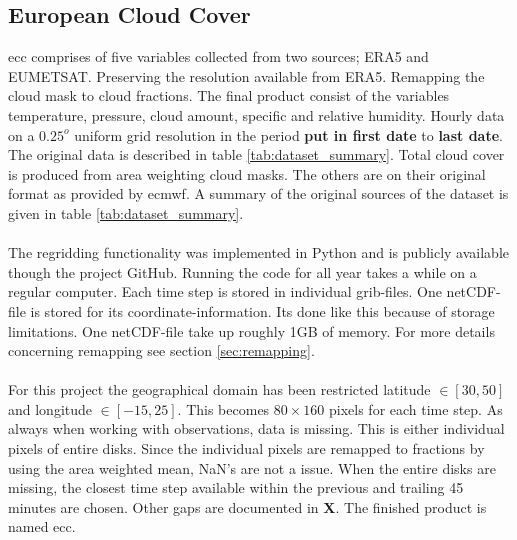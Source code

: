 \subsection{European Cloud Cover} \label{sec:ecc}
\acrfull{ecc} comprises of five variables collected from two sources; ERA5 and EUMETSAT. Preserving the resolution available from ERA5. Remapping the cloud mask to cloud fractions. The final product consist of the variables temperature, pressure, cloud amount, specific and relative humidity. Hourly data on a $0.25^o$ uniform grid  resolution in the period \textbf{put in first date} to \textbf{last date}. The original data is described in table \ref{tab:dataset_summary}. Total cloud cover is produced from area weighting cloud masks. The others are on their original format as provided by \acrfull{ecmwf}. A summary of the original sources of the dataset is given in table \ref{tab:dataset_summary}.
\\ \\
The regridding functionality was implemented in Python and is publicly available though the project GitHub. Running the code for all year takes a while on a regular computer. Each time step is stored in individual grib-files. One netCDF-file is stored for its coordinate-information. Its done like this because of storage limitations. One netCDF-file take up roughly 1GB of memory. For more details concerning remapping see section \ref{sec:remapping}. 
\\ \\
For this project the geographical domain has been restricted latitude $\in[30,50]$ and longitude $\in [-15, 25]$. This becomes $80\times160$ pixels for each time step. As always when working with observations, data is missing. This is either individual pixels of entire disks. Since the individual pixels are remapped to fractions by using the area weighted mean, NaN's are not a issue. When the entire disks are missing, the closest time step available within the previous and trailing 45 minutes are chosen. Other gaps are documented in \textbf{X}. The finished product is named \acrfull{ecc}.
